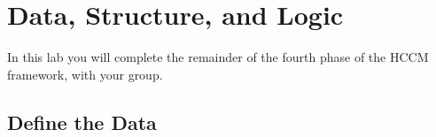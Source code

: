 \documentclass[
  10pt,
  a4paperpaper,
  DIV=11,
  numbers=noendperiod,
  oneside]{scrreprt}
\begin{document}
\begin{figure}

\begin{mdframed}[innerbottommargin=5cm]
~

~

~

~

~

~

~

~

~

~

~

~

~

\end{mdframed}

\end{figure}%

~

\begin{figure}

\begin{mdframed}[innerbottommargin=7cm]
~

~

~

~

~

~

~

~

~

~

~

~

~

~

~

~

\end{mdframed}

\end{figure}%

\chapter{Data, Structure, and Logic}\label{data-structure-and-logic}

In this lab you will complete the remainder of the fourth phase of the
HCCM framework, with your group.

\section{Define the Data}\label{define-the-data-1}
\end{document}
